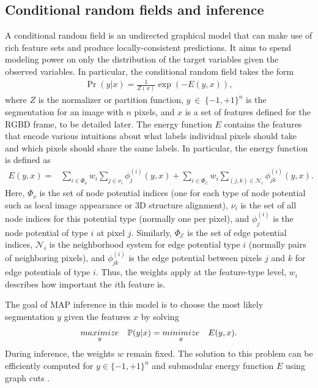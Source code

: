 \documentclass[journal]{IEEEtran}
\begin{document}
\subsection{Conditional random fields and inference}
\label{sec:inference}

A conditional random field is an undirected graphical model that can make use of rich feature sets and produce locally-consistent predictions.  It aims to spend modeling power on only the distribution of the target variables given the observed variables.  In particular, the conditional random field takes the form
\begin{align}
  \Pr(y | x) = \frac{1}{Z(x)} \exp(-E(y, x)),
\end{align}
where $Z$ is the normalizer or partition function, $y~\in~\{-1,+1\}^n$ is the segmentation for an image with $n$ pixels, and $x$ is a set of features defined for the RGBD frame, to be detailed later.  The energy function $E$ contains the features that encode various intuitions about what labels individual pixels should take and which pixels should share the same labels.  In particular, the energy function is defined as
\begin{align}
  E(y, x) = & \sum_{i \in \Phi_\nu} w_i \sum_{j \in \nu_i} \phi_j^{(i)}(y, x) \label{eqn:energy} + \sum_{i \in \Phi_{\mathcal{E}}} w_i \sum_{(j,k) \in \mathcal{N}_i}  \phi_{jk}^{(i)}(y, x).
\end{align}
Here, $\Phi_\nu$ is the set of node potential indices (\ie one for each type of node potential such as local image appearance or 3D structure alignment), $\nu_i$ is the set of all node indices for this potential type (normally one per pixel), and $\phi_j^{(i)}$ is the node potential of type $i$ at pixel $j$.  Similarly, $\Phi_\mathcal{E}$ is the set of edge potential indices, $\mathcal{N}_i$ is the neighborhood system for edge potential type $i$ (normally pairs of neighboring pixels), and $\phi_{jk}^{(i)}$ is the edge potential between pixels $j$ and $k$ for edge potentials of type $i$.  Thus, the weights apply at the feature-type level, \ie $w_i$ describes how important the $i$th feature is.

The goal of MAP inference in this model is to choose the most likely segmentation $y$ given the features $x$ by solving
\begin{align}
  \underset{y}{\relax{maximize}}\quad \mathbb{P}(y | x) = \underset{y}{\relax{minimize}}\quad E(y, x).
\end{align}
During inference, the weights $w$ remain fixed.  The solution to this problem can be efficiently computed for $y \in \{-1, +1\}^n$ and submodular energy function $E$ using graph cuts \cite{boykov2001a}.
\end{document}

